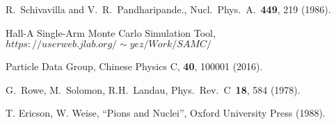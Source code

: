 \begin{thebibliography}{}
    R.~Schivavilla and V.~R.~Pandharipande.,
Nucl.~Phys.~A.~\textbf{449}, 219 (1986).

 Hall-A Single-Arm Monte Carlo Simulation Tool,\\
$https://userweb.jlab.org/ \sim yez/Work/SAMC/$

 Particle Data Group, Chinese Physics C, \textbf{40}, 100001
(2016).

 G.~Rowe, M.~Solomon, R.H.~Landau, Phys.~Rev.~C~\textbf{18}, 584
(1978).

 T. Ericson, W. Weise, ``Pions and Nuclei'', Oxford University
Press (1988).


\end{thebibliography}

